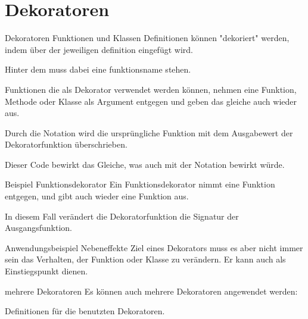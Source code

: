 \section{Dekoratoren}
\begin{frame}{Dekoratoren}
	Funktionen und Klassen Definitionen können "dekoriert" werden, indem über der jeweiligen definition  eingefügt wird.
	
	Hinter dem  muss dabei eine funktionsname stehen.	
\end{frame}

\begin{frame}
	Funktionen die als Dekorator verwendet werden können, nehmen eine Funktion, Methode oder Klasse als Argument entgegen und geben das gleiche auch wieder aus. 
	
	Durch die  Notation wird die ursprüngliche Funktion mit dem Ausgabewert der Dekoratorfunktion überschrieben.
	
	Dieser Code bewirkt das Gleiche, was auch mit der  Notation bewirkt würde. 
\end{frame}

\begin{frame}{Beispiel Funktionsdekorator}
	Ein Funktionsdekorator nimmt eine Funktion entgegen, und gibt auch wieder eine Funktion aus.
	
	
	In diesem Fall verändert die Dekoratorfunktion die Signatur der Ausgangsfunktion. 
\end{frame}

\begin{frame}{Anwendungsbeispiel Nebeneffekte}
	Ziel eines Dekorators muss es aber nicht immer sein das Verhalten, der Funktion oder Klasse zu verändern. Er kann auch als Einstiegspunkt dienen.
	
\end{frame}

\begin{frame}{mehrere Dekoratoren}
	Es können auch mehrere Dekoratoren angewendet werden:
	
\end{frame}

\begin{frame}
	Definitionen für die benutzten Dekoratoren.
	
\end{frame}

